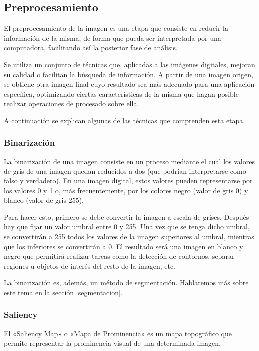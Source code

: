 \subsection{Preprocesamiento}\label{preprocesamiento}
El preprocesamiento de la imagen es una etapa que consiste en reducir la información de la
misma, de forma que pueda ser interpretada por una computadora, facilitando así la posterior fase de análisis.

Se utiliza un conjunto de técnicas que, aplicadas a las imágenes digitales, mejoran su calidad o facilitan la búsqueda de información. A partir de una imagen origen, se obtiene otra imagen final cuyo resultado sea más adecuado para una aplicación específica, optimizando ciertas características de la misma que hagan posible realizar operaciones de procesado sobre ella.

A continuación se explican algunas de las técnicas que comprenden esta etapa.


\subsubsection{Binarización}
La binarización de una imagen consiste en un proceso mediante el cual los valores de gris de una imagen quedan reducidos a dos (que podrían interpretarse como falso y verdadero). En una imagen digital, estos valores pueden representarse por los valores 0 y 1 o, más frecuentemente, por los colores negro (valor de gris 0) y blanco (valor de gris 255).

Para hacer esto, primero se debe convertir la imagen a escala de grises. Después hay que fijar
un valor umbral entre 0 y 255. Una vez que se tenga dicho umbral, se convertirán a 255 todos
los valores de la imagen superiores al umbral, mientras que los inferiores se convertirán a 0. El resultado será una imagen en blanco y negro que permitirá realizar tareas como la detección de contornos, separar regiones u objetos de interés del resto de la imagen, etc.

La binarización es, además, un método de segmentación. Hablaremos más sobre este tema en la sección \ref{segmentacion}.


\subsubsection{Saliency}\label{saliencymap}
El «Saliency Map» o «Mapa de Prominencia» \cite{Niebur:2007} es un mapa topográfico que permite representar
la prominencia visual de una determinada imagen.

